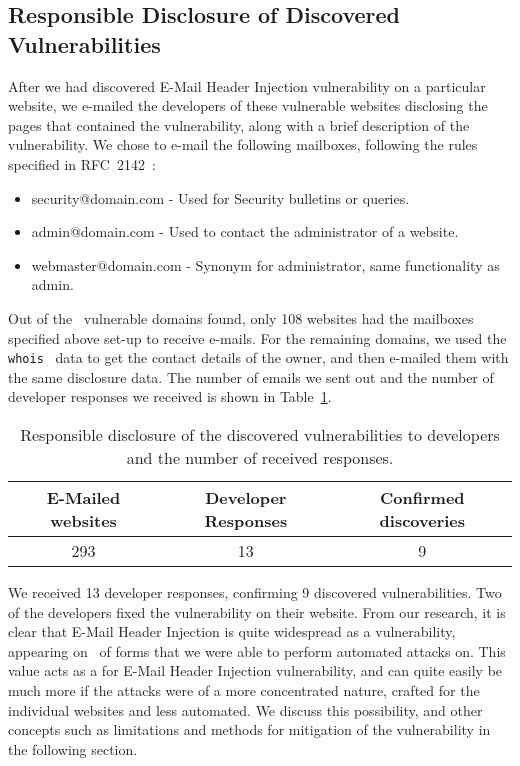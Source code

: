 \subsection{Responsible Disclosure of Discovered Vulnerabilities}
After we had discovered E-Mail Header Injection vulnerability on a particular website, we e-mailed the developers of these vulnerable websites disclosing the pages that contained the vulnerability, along with a brief description of the vulnerability.
We chose to e-mail the following mailboxes, following the rules specified in RFC~2142~\cite{rfc2142}:
\begin{itemize}
	\item security@domain.com - Used for Security bulletins or queries.
	\item admin@domain.com - Used to contact the administrator of a website.
	\item webmaster@domain.com - Synonym for administrator, same functionality as admin.
\end{itemize}

Out of the \domains\ vulnerable domains found, only 108 websites had the mailboxes specified above set-up to receive e-mails. For the remaining domains, we used the \texttt{whois}~\cite{whois} data to get the contact details of the owner, and then e-mailed them with the same disclosure data. The number of emails we sent out and the number of developer responses we received is shown in Table~\ref{tab:devresp}.

\begin{table}
\centering
\begin{tabular}{|c|c|c|}
	\hline
	\multicolumn{1}{|p{2cm}}{\centering \textbf{E-Mailed websites}} &
	\multicolumn{1}{|p{2cm}|}{\centering \textbf{Developer Responses}} &
	\multicolumn{1}{p{2cm}|}{\centering \textbf{Confirmed discoveries}}\\
	\hline
	293 & 13 & 9 \\
	\hline
\end{tabular}
	\caption[]{Responsible disclosure of the discovered vulnerabilities to developers and the number of received responses.}
	\label{tab:devresp}
\end{table}

We received 13 developer responses, confirming 9 discovered vulnerabilities. Two of the developers fixed the vulnerability on their website.
From our research, it is clear that E-Mail Header Injection is quite widespread as a vulnerability, appearing on \successDelta\ of forms that we were able to perform automated attacks on. This value acts as a  for E-Mail Header Injection vulnerability, and can quite easily be much more if the attacks were of a more concentrated nature, crafted for the individual websites and less automated. We discuss this possibility, and other concepts such as limitations and methods for mitigation of the vulnerability in the following section.